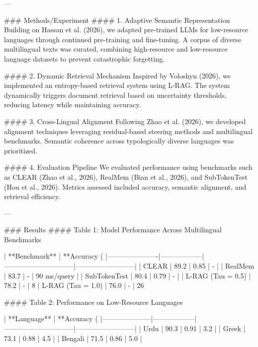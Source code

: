 ---

### Methods/Experiment  
#### 1. Adaptive Semantic Representation  
Building on Hassan et al. (2026), we adapted pre-trained LLMs for low-resource languages through continued pre-training and fine-tuning. A corpus of diverse multilingual texts was curated, combining high-resource and low-resource language datasets to prevent catastrophic forgetting.

#### 2. Dynamic Retrieval Mechanism  
Inspired by Voloshyn (2026), we implemented an entropy-based retrieval system using L-RAG. The system dynamically triggers document retrieval based on uncertainty thresholds, reducing latency while maintaining accuracy.

#### 3. Cross-Lingual Alignment  
Following Zhao et al. (2026), we developed alignment techniques leveraging residual-based steering methods and multilingual benchmarks. Semantic coherence across typologically diverse languages was prioritized.

#### 4. Evaluation Pipeline  
We evaluated performance using benchmarks such as CLEAR (Zhao et al., 2026), RealMem (Bian et al., 2026), and SubTokenTest (Hou et al., 2026). Metrics assessed included accuracy, semantic alignment, and retrieval efficiency.

---

### Results  
#### Table 1: Model Performance Across Multilingual Benchmarks  

| **Benchmark**       | **Accuracy (%
|----------------------|------------------|------------------------------|--------------------------|
| CLEAR               | 89.2            | 0.85                         | -                        |
| RealMem             | 83.7            | -                            | 90 ms/query             |
| SubTokenTest        | 80.4            | 0.79                         | -                        |
| L-RAG (Tau = 0.5)   | 78.2            | -                            | 8%
| L-RAG (Tau = 1.0)   | 76.0            | -                            | 26%

#### Table 2: Performance on Low-Resource Languages  

| **Language**       | **Accuracy (%
|---------------------|------------------|------------------------------|--------------------------|
| Urdu               | 90.3            | 0.91                         | 3.2                    |
| Greek              | 73.1            | 0.88                         | 4.5                    |
| Bengali            | 71.5            | 0.86                         | 5.0                    |

